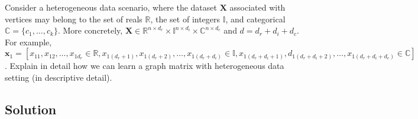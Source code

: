 \documentclass[a4paper]{article}
\newcommand{\mf}{\mathbf}
\newcommand{\mb}{\mathbb}
\newcommand{\R}{\mathbb{R}}
\begin{document}
Consider a heterogeneous data scenario, where the dataset $\mf{X}$ associated with vertices may belong to the set of reals $\R$, the set of integers $\mb{I}$, and categorical $\mb{C} = \{c_1,
\ldots, c_k\}$. More concretely, $\mf{X} \in \R^{n \times d_r} \times \mb{I}^{n \times d_i} \times \mb{C}^{n \times d_c}$ and $d = d_r + d_i + d_c$. For example, $\mf{x}_1 = [x_{11}, x_{12},
\ldots, x_{1d_r} \in \R, x_{1(d_r + 1)}, x_{1(d_r + 2)}, \ldots, x_{1(d_r + d_i)} \in \mb{I}, x_{1(d_r + d_i + 1)}, d_{1(d_r + d_i + 2)}, \ldots, x_{1(d_r + d_i + d_c)} \in \mb{C}]$. Explain in
detail how we can learn a graph matrix with heterogeneous data setting (in descriptive detail).

\subsection{Solution}
\end{document}
